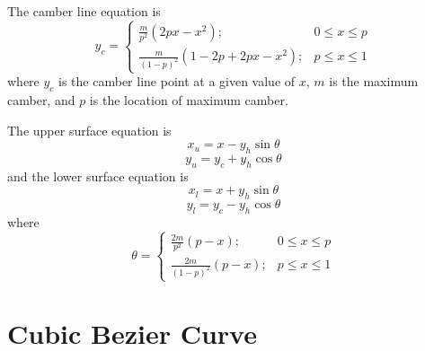 \documentclass{turgon}
\begin{document}
\begin{flushleft}
\bigbreak
The camber line equation is
\begin{equation}
    y_c =
    \begin{cases}
    \frac{m}{p^2} (2px - x^2); & 0 \leq x \leq p \\
    \frac{m}{(1-p)^2} (1 - 2p + 2px - x^2);  &  p \leq x \leq 1
    \end{cases}
\end{equation}
where $y_c$ is the camber line point at a given value of $x$, $m$ is the
maximum camber, and $p$ is the location of maximum camber.

\bigbreak
The upper surface equation is
\begin{equation}
    x_u = x - y_h \sin\theta
    \label{eq:naca:up_x}
\end{equation}
\begin{equation}
    y_u = y_c + y_h \cos\theta
    \label{eq:naca:up_y}
\end{equation}
and the lower surface equation is
\begin{equation}
    x_l = x + y_h \sin\theta
\end{equation}
\begin{equation}
    y_l = y_c - y_h \cos\theta
\end{equation}
where
\begin{equation}
    \theta =
    \begin{cases}
    \frac{2m}{p^2} (p - x); & 0 \leq x \leq p \\
    \frac{2m}{(1-p)^2} (p - x);  &  p \leq x \leq 1
    \end{cases}
\end{equation}

\end{flushleft}

\chapter{Cubic Bezier Curve}

\end{document}
